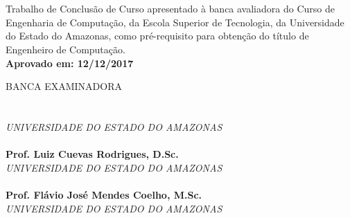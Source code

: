 
\begin{center}
\bf \MakeUppercase{\nome}\\[1.5 cm]
\end{center}

\begin{center}
\bf \MakeUppercase{\titulo}\\[1.5cm]
\end{center}

\hspace*{8cm}
\begin{minipage}{8cm}

Trabalho de Conclusão de Curso apresentado à
banca avaliadora do Curso de Engenharia de Computação,
da Escola Superior de Tecnologia, da Universidade do Estado do Amazonas,
como pré-requisito para obtenção do título de
Engenheiro de Computação.\\

\large \bf Aprovado em: 12/12/2017
\end{minipage}

BANCA EXAMINADORA\\[12 pt]

\noindent \hrulefill \hspace*{6cm} \\
\noindent \textbf{\orientador}\\
\textit{UNIVERSIDADE DO ESTADO DO AMAZONAS}\\[0.5cm]

\noindent \hrulefill \hspace*{6cm} \\
\noindent \textbf{Prof. Luiz Cuevas Rodrigues, D.Sc.}\\
\textit{UNIVERSIDADE DO ESTADO DO AMAZONAS}\\[0.5cm]

\noindent \hrulefill \hspace*{6cm} \\
\noindent \textbf{Prof. Flávio José Mendes Coelho, M.Sc.}\\
\textit{UNIVERSIDADE DO ESTADO DO AMAZONAS}\\
